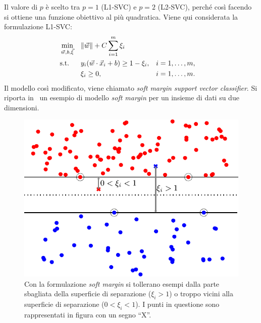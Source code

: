 %
Il valore di $p$ è scelto tra $p=1$ (L1-SVC) e $p=2$ (L2-SVC), perché così facendo si ottiene una funzione obiettivo al più quadratica. 
Viene qui considerata la formulazione L1-SVC:
\begin{equation}
\label{eq:svc:softmargin:primal}
\begin{aligned}
& \min_{\Vec{w},b,\Vec{\xi}}    && \|\Vec{w}\| + C\sum_{i=1}^{m}\xi_i\\
& \textrm{s.t.} && y_i(\Vec{w}\cdot\Vec{x}_i + b) \geq 1 - \xi_i, &&  i=1,\dots,m, \\
&               && \xi_i \geq 0,                 &&  i=1,\dots,m.\\
\end{aligned}
\end{equation}
Il modello così modificato, viene chiamato \emph{soft margin support vector classifier}.
Si riporta in~ un esempio di modello \emph{soft margin} per un insieme di dati su due dimensioni.

\begin{figure}
    \centering
    \includegraphics[width=.7\linewidth]{img/soft_margin.pdf}
    \caption[Esempio classificazione \emph{soft margin}.]{Con la formulazione \emph{soft margin} si tollerano esempi dalla parte sbagliata della superficie di separazione ($\xi_i>1$) o troppo vicini alla superficie di separazione ($0<\xi_i<1$). I punti in questione sono rappresentati in figura con un segno ``X''.}
    \label{fig:soft_margin}
\end{figure}



